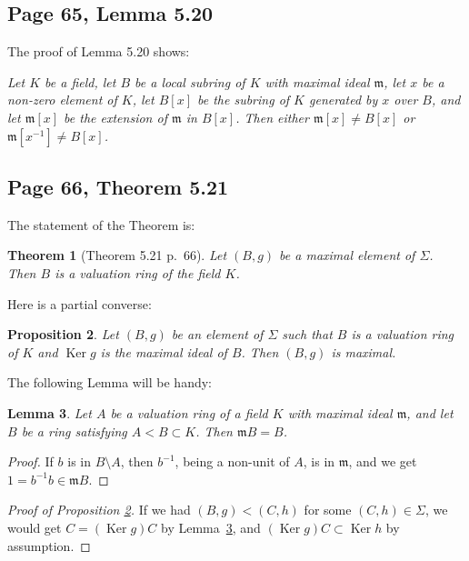 \documentclass[parskip=half,fontsize=12pt]{scrartcl}%
\newcommand{\mf}{\mathfrak}
\newcommand{\mmm}{\mf m}
\newcommand{\Ker}{\operatorname{Ker}}\newcommand{\Coker}{\operatorname{Coker}}
\newtheorem{thm}{Theorem}%
\newtheorem{lem}[thm]{Lemma}
\newtheorem{prop}[thm]{Proposition}
\begin{document}
\subsection{Page 65, Lemma 5.20}\label{520}%

The proof of Lemma 5.20 shows:

\emph{Let $K$ be a field, let $B$ be a local subring of $K$ with maximal ideal $\mmm$, let $x$ be a non-zero element of $K$, let $B[x]$ be the subring of $K$ generated by $x$ over $B$, and let $\mmm[x]$ be the extension of $\mmm$ in $B[x]$. Then either $\mmm[x]\ne B[x]$ or $\mmm[x^{-1}]\ne B[x]$.}

\subsection{Page 66, Theorem 5.21}%

The statement of the Theorem is:

\begin{thm}[Theorem 5.21 p.~66]
Let $(B,g)$ be a maximal element of $\Sigma$. Then $B$ is a valuation ring of the field $K$.
\end{thm}

Here is a partial converse:

\begin{prop}\label{521}
Let $(B,g)$ be an element of $\Sigma$ such that $B$ is a valuation ring of $K$ and $\Ker g$ is the maximal ideal of $B$. Then $(B,g)$ is maximal.
\end{prop}

The following Lemma will be handy:

\begin{lem}\label{vrok}
Let $A$ be a valuation ring of a field $K$ with maximal ideal $\mmm$, and let $B$ be a ring satisfying $A<B\subset K$. Then $\mmm B=B$.
\end{lem}

\begin{proof}
If $b$ is in $B\setminus A$, then $b^{-1}$, being a non-unit of $A$, is in $\mmm$, and we get $1=b^{-1}b\in\mmm B$.
\end{proof}

\begin{proof}[Proof of Proposition \ref{521}] 
If we had $(B,g)<(C,h)$ for some $(C,h)\in\Sigma$, we would get $C=(\Ker g)C$ by Lemma~\ref{vrok}, and $(\Ker g)C\subset\Ker h$ by assumption. %
\end{proof}
\end{document}
